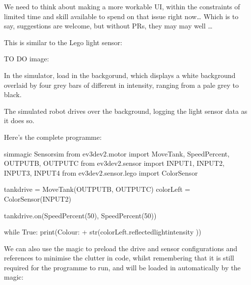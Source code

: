 \documentclass[letterpaper,10pt,english]{sphinxmanual}
\begin{document}
We need to think about making a more workable UI, within the constraints of limited time and skill available to spend on that issue right now… Which is to say, suggestions are welcome, but without PRs, they may may well …



This is similar to the Lego light sensor:

TO DO image: 

In the simulator, load in the  backgorund, which displays a white background overlaid by four grey bars of different in intensity, ranging from a pale grey to black.

The simulated robot drives over the background, logging the light sensor data as it does so.

Here’s the complete programme:

{
\begin{sphinxVerbatim}[commandchars=\\\{\}]
\llap{\color{nbsphinxin}[ ]:\,\hspace{\fboxrule}\hspace{\fboxsep}}\PYGZpc{}\PYGZpc{}sim\PYGZus{}magic
\PYGZsh{} Sensor\PYGZus{}sim
from ev3dev2.motor import MoveTank, SpeedPercent, OUTPUT\PYGZus{}B, OUTPUT\PYGZus{}C
from ev3dev2.sensor import INPUT\PYGZus{}1, INPUT\PYGZus{}2, INPUT\PYGZus{}3, INPUT\PYGZus{}4
from ev3dev2.sensor.lego import ColorSensor


tank\PYGZus{}drive = MoveTank(OUTPUT\PYGZus{}B, OUTPUT\PYGZus{}C)
colorLeft = ColorSensor(INPUT\PYGZus{}2)

tank\PYGZus{}drive.on(SpeedPercent(50), SpeedPercent(50))

while True:
    print(\PYGZsq{}Colour: \PYGZsq{} + str(colorLeft.reflected\PYGZus{}light\PYGZus{}intensity ))
\end{sphinxVerbatim}
}

We can also use the  magic to preload the drive and sensor configurations and references to minimise the clutter in  code, whilst remembering that it is still required for the programme to run, and will be loaded in automatically by the magic:
\end{document}
